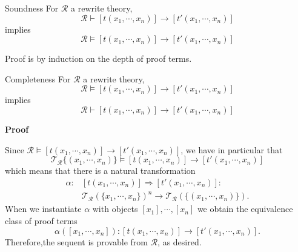 \documentclass{beamer}
\begin{document}
\begin{frame}
\begin{block}{Soundness}
    For $\mathcal{R}$ a rewrite theory,
    $$ \mathcal{R} \vdash [t(x_1,\cdots,x_n)] \rightarrow [t'(x_1,\cdots,x_n)]
    $$
    implies
    $$\mathcal{R} \models [t(x_1,\cdots,x_n)] \rightarrow [t'(x_1,\cdots,x_n)]
    $$ 
\end{block}
Proof is by induction on the depth of proof terms.
\end{frame}
\begin{frame}
    \scriptsize
    \begin{block}{Completeness}
        For $\mathcal{R}$ a rewrite theory,
        $$ \mathcal{R} \models [t(x_1,\cdots,x_n)] \rightarrow [t'(x_1,\cdots,x_n)]
        $$
        implies
        $$\mathcal{R} \vdash [t(x_1,\cdots,x_n)] \rightarrow [t'(x_1,\cdots,x_n)]
        $$ 

        \pause
        \bigskip
        \textbf{Proof}

        Since $\mathcal{R} \models [t(x_1,\cdots,x_n)] \rightarrow [t'(x_1,\cdots,x_n)]$, we have in particular that 
        $$ \mathcal{T_R}\{(x_1,\cdots,x_n)\} \models [t(x_1,\cdots,x_n)] \rightarrow [t'(x_1,\cdots,x_n)]$$
        which means that there is a natural transformation 
        \begin{align*}
         \alpha:& [t(x_1,\cdots,x_n)] \Rightarrow [t'(x_1,\cdots,x_n)] : \\
        &\mathcal{T_R}(\{x_1,\cdots,x_n\})^n \rightarrow \mathcal{T_R}(\{(x_1,\cdots,x_n)\}).
        \end{align*}
        When we instantiate $\alpha$ with objects $[x_1],\cdots,[x_n]$ we obtain the equivalence class  
        of proof terms 
        $$\alpha([x_1,\cdots, x_n]): [t(x_1,\cdots,x_n)] \rightarrow [t'(x_1,\cdots,x_n)].
        $$
        Therefore,the sequent is provable from $\mathcal{R}$, as desired.
    \end{block}
\end{frame}
\end{document}
